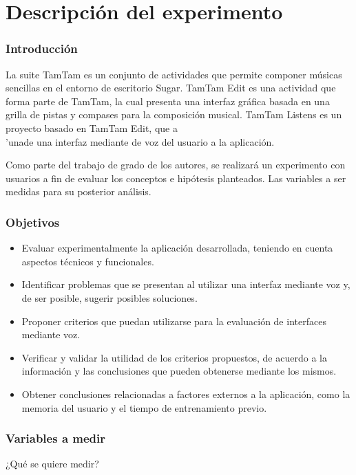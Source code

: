 \section{Descripci\'on del experimento}

\subsubsection{Introducci\'on}

La suite TamTam es un conjunto de actividades que permite componer m\'usicas sencillas en el entorno de escritorio Sugar. TamTam Edit es una actividad que forma parte de TamTam, la cual presenta una interfaz gr\'afica basada en una grilla de pistas y compases para la composici\'on musical. TamTam Listens es un proyecto basado en TamTam Edit, que a\\'unade una interfaz mediante de voz del usuario a la aplicaci\'on.

Como parte del trabajo de grado de los autores, se realizar\'a un experimento con usuarios a fin de evaluar los conceptos e hip\'otesis planteados. Las variables a ser medidas para su posterior an\'alisis.

\subsubsection{Objetivos}

\begin{itemize}
\item Evaluar experimentalmente la aplicaci\'on desarrollada, teniendo en cuenta aspectos t\'ecnicos y funcionales.
\item Identificar problemas que se presentan al utilizar una interfaz mediante voz y, de ser posible, sugerir posibles soluciones.
\item Proponer criterios que puedan utilizarse para la evaluaci\'on de interfaces mediante voz.
\item Verificar y validar la utilidad de los criterios propuestos, de acuerdo a la informaci\'on y las conclusiones que pueden obtenerse mediante los mismos.
\item Obtener conclusiones relacionadas a factores externos a la aplicaci\'on, como la memoria del usuario y el tiempo de entrenamiento previo.
\end{itemize}

\subsubsection{Variables a medir}
¿Qu\'e se quiere medir?

